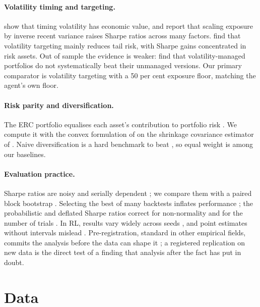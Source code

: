 \documentclass[11pt]{article}
\begin{document}
\paragraph{Volatility timing and targeting.} \citet{fleming2001} show that timing volatility has economic value, and \citet{moreira2017} report that scaling exposure by inverse recent variance raises Sharpe ratios across many factors. \citet{harvey2018vt} find that volatility targeting mainly reduces tail risk, with Sharpe gains concentrated in risk assets. Out of sample the evidence is weaker: \citet{cederburg2020} find that volatility-managed portfolios do not systematically beat their unmanaged versions. Our primary comparator is volatility targeting with a 50 per cent exposure floor, matching the agent's own floor.

\paragraph{Risk parity and diversification.} The ERC portfolio equalises each asset's contribution to portfolio risk \citep{maillard2010}. We compute it with the convex formulation of \citet{spinu2013} on the shrinkage covariance estimator of \citet{ledoit2004}. Naive diversification is a hard benchmark to beat \citep{demiguel2009}, so equal weight is among our baselines.

\paragraph{Evaluation practice.} Sharpe ratios are noisy and serially dependent \citep{lo2002}; we compare them with a paired block bootstrap \citep{politis1992,ledoit2008}. Selecting the best of many backtests inflates performance \citep{bailey2014notices,harvey2016}; the probabilistic and deflated Sharpe ratios correct for non-normality and for the number of trials \citep{bailey2012psr,bailey2014dsr}. In RL, results vary widely across seeds \citep{henderson2018}, and point estimates without intervals mislead \citep{agarwal2021}. Pre-registration, standard in other empirical fields, commits the analysis before the data can shape it \citep{nosek2018}; a registered replication on new data is the direct test of a finding that analysis after the fact has put in doubt.

\section{Data}\label{sec:data}
\end{document}
